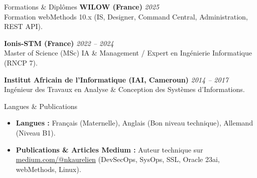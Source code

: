 \documentclass{resume}
\begin{document}
\begin{rSection}{Formations \& Diplômes}
{\bf WILOW (France)} \hfill {\em 2025} \\
Formation webMethods 10.x (IS, Designer, Command Central, Administration, REST API).

{\bf Ionis-STM (France)} \hfill {\em 2022 -- 2024} \\
Master of Science (MSc) IA \& Management / Expert en Ingénierie Informatique (RNCP 7).

{\bf Institut Africain de l'Informatique (IAI, Cameroun)} \hfill {\em 2014 -- 2017} \\
Ingénieur des Travaux en Analyse \& Conception des Systèmes d'Informations.
\end{rSection}

\begin{rSection}{Langues \& Publications}
\begin{itemize} \itemsep -0.3em
    \item {\bf Langues :} Français (Maternelle), Anglais (Bon niveau technique), Allemand (Niveau B1).
    \item {\bf Publications \& Articles Medium :} Auteur technique sur \href{https://medium.com/@nkaurelien}{medium.com/@nkaurelien} (DevSecOps, SysOps, SSL, Oracle 23ai, webMethods, Linux).
\end{itemize}
\end{rSection}
\end{document}
